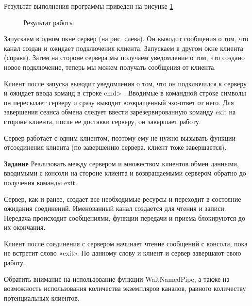 \documentclass[a4paper]{article}
\begin{document}
	Результат выполнения программы приведен на рисунке \ref{img:task3}.
	\begin{figure}[h!]
		\caption{Результат работы}
		\label{img:task3}
	\end{figure}
	
	Запускаем в одном окне сервер (на рис. слева). Он выводит сообщения о том, что канал создан и ожидает подключения клиента. Запускаем в другом окне клиента (справа). Затем на стороне сервера мы получаем уведомление о том, что создано новое подключение, теперь мы можем получать сообщения от клиента.
	
	Клиент после запуска выводит уведомления о том, что он подключился к серверу и ожидает ввода команд в строке cmd> . Вводимые в командной строке символы он пересылает серверу и сразу выводит возвращенный эхо-ответ от него. Для завершения сеанса обмена следует ввести зарезервированную команду exit на стороне клиента, после ее доставки серверу, он завершает работу.
	
	Сервер работает с одним клиентом, поэтому ему не нужно вызывать функции отсоединения клиента (по завершению сервера, клиент тоже завершается).
	
	\textbf{Задание} Реализовать между сервером и множеством клиентов обмен данными, вводимыми с консоли на стороне клиента и возвращаемыми сервером обратно до получения команды exit.
	
	Сервер, как и ранее, создает все необходимые ресурсы и переходит в состояние ожидания соединений. Именованный канал создается для чтения и записи. Передача происходит сообщениями, функции передачи и приема блокируются до их окончания.
	
	Клиент после соединения с сервером начинает чтение сообщений с консоли, пока не встретит слово «exit». По данному слову и клиент и сервер завершают свою работу.
	
	Обратить внимание на использование функции WaitNamedPipe, а также на возможность использования количества экземпляров каналов, равного количеству потенциальных клиентов.
	
\end{document}
